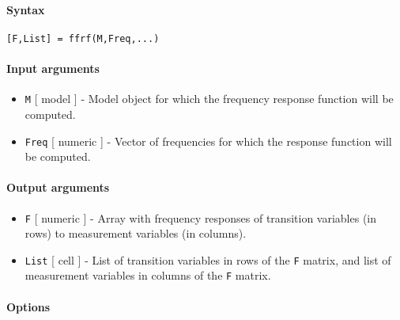 


	\paragraph{Syntax}\label{syntax}

\begin{verbatim}
[F,List] = ffrf(M,Freq,...)
\end{verbatim}

\paragraph{Input arguments}\label{input-arguments}

\begin{itemize}
\item
  \texttt{M} {[} model {]} - Model object for which the frequency
  response function will be computed.
\item
  \texttt{Freq} {[} numeric {]} - Vector of frequencies for which the
  response function will be computed.
\end{itemize}

\paragraph{Output arguments}\label{output-arguments}

\begin{itemize}
\item
  \texttt{F} {[} numeric {]} - Array with frequency responses of
  transition variables (in rows) to measurement variables (in columns).
\item
  \texttt{List} {[} cell {]} - List of transition variables in rows of
  the \texttt{F} matrix, and list of measurement variables in columns of
  the \texttt{F} matrix.
\end{itemize}

\paragraph{Options}\label{options}

